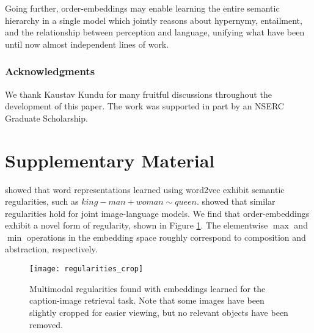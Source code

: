 \documentclass{article} \usepackage{iclr2016_conference,times}
\begin{document}
Going further, order-embeddings may enable learning the entire semantic hierarchy in a single model which jointly reasons about hypernymy, entailment, and the relationship between perception and language, unifying what have been until now almost independent lines of work. 


\subsubsection*{Acknowledgments}
We thank Kaustav Kundu for many fruitful discussions throughout the development of this paper. The work was supported in part by an NSERC Graduate Scholarship. 




\clearpage
\newpage
\section{Supplementary Material}
\citet{mikolov2013linguistic} showed that word representations learned using word2vec exhibit semantic regularities, such as $king - man + woman \sim queen$. \citet{kiros2014} showed that  similar regularities hold for joint image-language models. We find that order-embeddings exhibit a novel form of regularity, shown in Figure \ref{fig:regularities}. The elementwise $\max$ and $\min$ operations in the embedding space roughly correspond to composition and abstraction, respectively.

\begin{figure}[h]
	\centering
	\texttt{[image: regularities\_crop]}
	\caption{Multimodal regularities found with embeddings learned for the caption-image retrieval task. Note that some images have been slightly cropped for easier viewing, but no relevant objects have been removed. }
	\label{fig:regularities}
\end{figure} 
\end{document}

